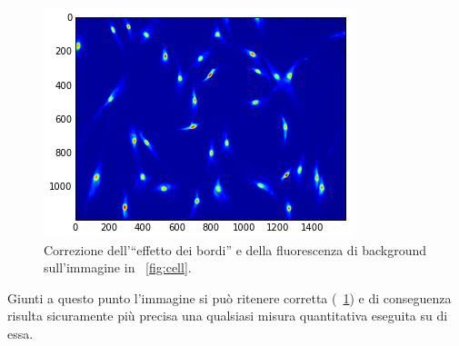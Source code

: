 \begin{figure}
 \centering
 \includegraphics[scale=1]{img/CAP3cellcorr.png}
 \caption{\small{Correzione dell'``effetto dei bordi'' e della fluorescenza di background sull'immagine in \figurename~\ref{fig:cell}.}}
 \label{fig:cellcorr}
\end{figure}

Giunti a questo punto l'immagine si può ritenere corretta (\figurename~\ref{fig:cellcorr}) e di conseguenza risulta sicuramente più precisa una qualsiasi misura quantitativa eseguita su di essa.
